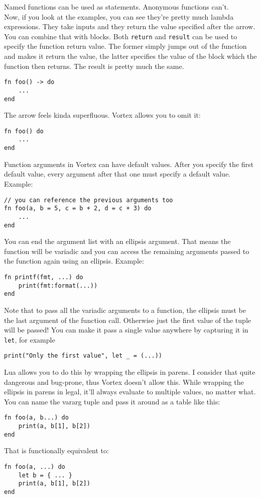\documentclass{article}
\begin{document}
Named functions can be used as statements. Anonymous functions can't.\\
Now, if you look at the examples, you can see they're pretty much lambda
expressions. They take inputs and they return the value specified after
the arrow. You can combine that with blocks. Both \verb|return| and
\verb|result| can be used to specify the function return value. The
former simply jumps out of the function and makes it return the value,
the latter specifies the value of the block which the function then
returns. The result is pretty much the same.
\begin{lstlisting}[language=vortex]
fn foo() -> do
    ...
end
\end{lstlisting}
The arrow feels kinda superfluous. Vortex allows you to omit it:
\begin{lstlisting}[language=vortex]
fn foo() do
    ...
end
\end{lstlisting}
Function arguments in Vortex can have default values. After you specify
the first default value, every argument after that one must specify a default
value. Example:
\begin{lstlisting}[language=vortex]
// you can reference the previous arguments too
fn foo(a, b = 5, c = b + 2, d = c + 3) do
    ...
end
\end{lstlisting}
You can end the argument list with an ellipsis argument. That means the
function will be variadic and you can access the remaining arguments
passed to the function again using an ellipsis. Example:
\begin{lstlisting}[language=vortex]
fn printf(fmt, ...) do
    print(fmt:format(...))
end
\end{lstlisting}
Note that to pass all the variadic arguments to a function, the ellipsis
must be the last argument of the function call. Otherwise just the first
value of the tuple will be passed! You can make it pass a single value
anywhere by capturing it in \verb|let|, for example
\begin{lstlisting}[language=vortex]
print("Only the first value", let _ = (...))
\end{lstlisting}
Lua allows you to do this by wrapping the ellipsis in parens. I consider
that quite dangerous and bug-prone, thus Vortex doesn't allow this. While
wrapping the ellipsis in parens in legal, it'll always evaluate to multiple
values, no matter what.\\
You can name the vararg tuple and pass it around as a table like this:
\begin{lstlisting}[language=vortex]
fn foo(a, b...) do
    print(a, b[1], b[2])
end
\end{lstlisting}
That is functionally equivalent to:
\begin{lstlisting}[language=vortex]
fn foo(a, ...) do
    let b = { ... }
    print(a, b[1], b[2])
end
\end{lstlisting}
\end{document}
